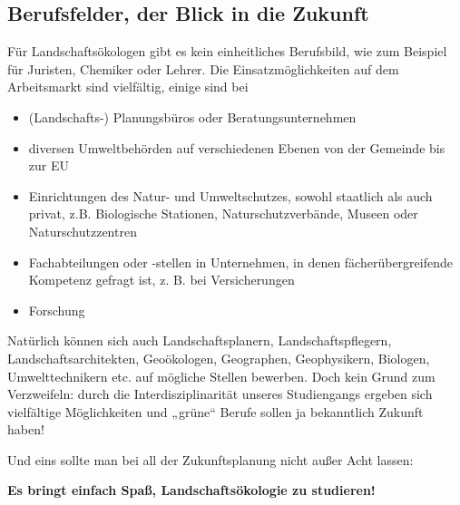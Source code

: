 \subsection*{Berufsfelder, der Blick in die Zukunft}
Für Landschaftsökologen gibt es kein einheitliches Berufsbild, wie zum Beispiel für Juristen, Chemiker oder Lehrer. Die Einsatzmöglichkeiten auf dem Arbeitsmarkt sind vielfältig, einige sind bei
\begin{itemize}
  \item (Landschafts-) Planungsbüros oder Beratungsunternehmen
  \item diversen Umweltbehörden auf verschiedenen Ebenen von der Gemeinde bis zur EU
  \item Einrichtungen des Natur- und Umweltschutzes, sowohl staatlich als auch privat, z.B. Biologische Stationen, Naturschutzverbände, Museen oder Naturschutzzentren
  \item Fachabteilungen oder -stellen in Unternehmen, in denen fächerübergreifende Kompetenz gefragt ist, z. B. bei Versicherungen
  \item{Forschung}
\end{itemize}
Natürlich können sich auch Landschaftsplanern, Landschaftspﬂegern,\\ Landschaftsarchitekten, Geoökologen, Geographen, Geophysikern, Biologen, Umwelttechnikern etc. auf mögliche Stellen bewerben. Doch kein Grund zum Verzweifeln: durch die Interdisziplinarität unseres Studiengangs ergeben sich vielfältige Möglichkeiten und „grüne“ Berufe sollen ja bekanntlich Zukunft haben!

Und eins sollte man bei all der Zukunftsplanung nicht außer Acht lassen: 

\textbf{Es bringt einfach Spaß, Landschaftsökologie zu studieren!}
